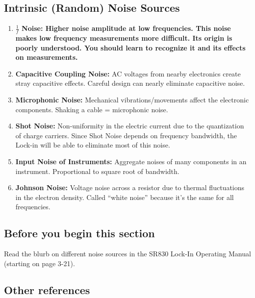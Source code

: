 \documentclass{../lab}
\begin{document}
\subsection{Intrinsic (Random) Noise Sources}

\begin{enumerate}
    \item \textbf{$ \frac{1}{f} $ Noise: Higher noise amplitude at low frequencies. This noise makes low frequency measurements more difficult. Its origin is poorly understood. You should learn to recognize it and its effects on measurements.}

    \item \textbf{Capacitive Coupling Noise:} AC voltages from nearby electronics create stray capacitive effects. Careful design can nearly eliminate capacitive noise.

    \item \textbf{Microphonic Noise:} Mechanical vibrations/movements affect the electronic components. Shaking a cable = microphonic noise.

    \item \textbf{Shot Noise:} Non-uniformity in the electric current due to the quantization of charge carriers. Since Shot Noise depends on frequency bandwidth, the Lock-in will be able to eliminate most of this noise.

    \item \textbf{Input Noise of Instruments:} Aggregate noises of many components in an instrument. Proportional to square root of bandwidth.

    \item \textbf{Johnson Noise:} Voltage noise across a resistor due to thermal fluctuations in the electron density. Called ``white noise'' because it's the same for all frequencies.

\end{enumerate}

\subsection{Before you begin this section}

Read the blurb on different noise sources in the SR830 Lock-In Operating Manual (starting on page 3-21).

\subsection{Other references}
\end{document}
